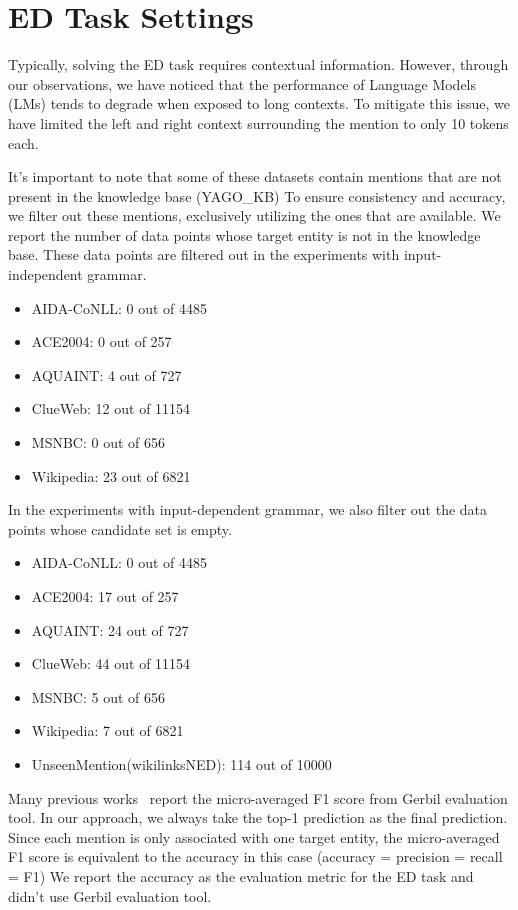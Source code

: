 \section{ED Task Settings}\label{app_sec:entity_disambiguation}

%
Typically, solving the ED task requires contextual information.
However, through our observations, we have noticed that the performance of Language Models (LMs) tends to degrade when exposed to long contexts.
To mitigate this issue, we have limited the left and right context surrounding the mention to only 10 tokens each.
%

It's important to note that some of these datasets contain mentions that are not present in the knowledge base (YAGO\_KB)
To ensure consistency and accuracy, we filter out these mentions, exclusively utilizing the ones that are available.
%
We report the number of data points whose target entity is not in the knowledge base.
These data points are filtered out in the experiments with input-independent grammar.

\begin{itemize}
    \item AIDA-CoNLL: 0 out of 4485
    \item ACE2004: 0 out of 257
    \item AQUAINT: 4 out of 727
    \item ClueWeb: 12 out of 11154
    \item MSNBC: 0 out of 656
    \item Wikipedia: 23 out of 6821
\end{itemize}

In the experiments with input-dependent grammar, we also filter out the data points whose candidate set is empty.
\begin{itemize}
    \item AIDA-CoNLL: 0 out of 4485
    \item ACE2004: 17 out of 257
    \item AQUAINT: 24 out of 727
    \item ClueWeb: 44 out of 11154
    \item MSNBC: 5 out of 656
    \item Wikipedia: 7 out of 6821
    \item UnseenMention(wikilinksNED): 114 out of 10000
\end{itemize}

Many previous works~\cite{decao2021autoregressive, ganea2017deep, ayoola-etal-2022-refined} report the micro-averaged F1 score from Gerbil evaluation tool.
In our approach, we always take the top-1 prediction as the final prediction.
Since each mention is only associated with one target entity, the micro-averaged F1 score is equivalent to the accuracy in this case (accuracy = precision = recall = F1)
We report the accuracy as the evaluation metric for the ED task and didn't use Gerbil evaluation tool.